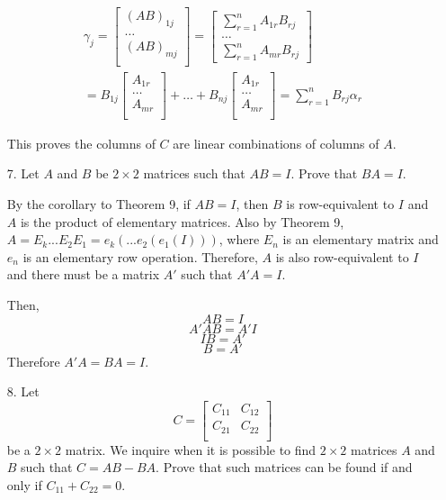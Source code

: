 \documentclass{article}
\begin{document}
\begin{enumerate}[listparindent=\parindent]
\begin{gather*}
    \gamma_j = \begin{bmatrix}
        (AB)_{1j} \\
        \dots \\
        (AB)_{mj} \\
    \end{bmatrix}
    =
    \begin{bmatrix}
        \sum_{r = 1}^{n} A_{1r}B_{rj} \\
        \dots \\
        \sum_{r = 1}^{n} A_{mr}B_{rj}
    \end{bmatrix}
    \\
    =
    B_{1j}
    \begin{bmatrix}
        A_{1r} \\
        \dots \\
        A_{mr} \\
    \end{bmatrix}
    +
    \dots
    +
    B_{nj}
    \begin{bmatrix}
        A_{1r} \\
        \dots \\
        A_{mr} \\
    \end{bmatrix}
    =
    \sum_{r = 1}^{n} B_{rj} \alpha_r
\end{gather*}

This proves the columns of \(C\) are linear combinations of columns of \(A\).

\item[7.] Let \(A\) and \(B\) be \(2 \times 2\) matrices such that \(AB = I\). Prove that \(BA = I\).

By the corollary to Theorem 9, if \(AB = I\), then \(B\) is row-equivalent to \(I\) and \(A\) is the product of elementary matrices.
Also by Theorem 9, \(A = E_k...E_2E_1 = e_k(...e_2(e_1(I)))\), where \(E_n\) is an elementary matrix and \(e_n\) is an elementary row operation.
Therefore, \(A\) is also row-equivalent to \(I\) and there must be a matrix \(A'\) such that \(A'A = I\).

Then,
\[AB = I\]
\[A'AB = A'I\]
\[IB = A'\]
\[B = A'\]
Therefore \(A'A = BA = I\).

\item[8.] Let
    \[
        C = \begin{bmatrix}
            C_{11} & C_{12} \\
            C_{21} & C_{22} \\
        \end{bmatrix}
    \]
    be a \(2 \times 2\) matrix. We inquire when it is possible to find \(2 \times 2\) matrices \(A\) and \(B\) such that \(C = AB - BA\).
    Prove that such matrices can be found if and only if \(C_{11} + C_{22} = 0\).


\end{enumerate}
\end{document}
